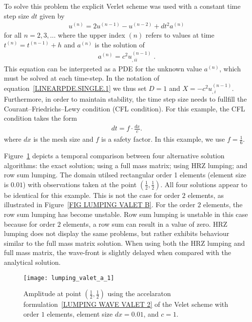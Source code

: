 To solve this problem the explicit Verlet scheme was used 
with a constant time step size $dt$ given by 
\begin{eqnarray} \label{LUMPING WAVE VALET}
u^{(n)}=2u^{(n-1)}-u^{(n-2)} + dt^2 a^{(n)}
\end{eqnarray}
for all $n=2,3,\ldots$ where the upper index ${(n)}$ refers to values at 
time $t^{(n)}=t^{(n-1)}+h$ and $a^{(n)}$ is the solution of 
\begin{eqnarray} \label{LUMPING WAVE VALET 2} 
a^{(n)}=c^2 u^{(n-1)}_{,ii} \; .
\end{eqnarray}
This equation can be interpreted as a PDE for the unknown value $a^{(n)}$,
which must be solved at each time-step. 
In the notation of equation~\ref{LINEARPDE.SINGLE.1} we thus set $D=1$ and 
$X=-c^2 u^{(n-1)}_{,i}$. Furthermore, in order to maintain stability, 
the time step size needs to fullfill the Courant–Friedrichs–Lewy condition 
(CFL condition).
For this example, the CFL condition takes the form 
\begin{eqnarray} \label{LUMPING WAVE CFL} 
dt = f \cdot \frac{dx}{c} .
\end{eqnarray}
where $dx$ is the mesh size and $f$ is a safety factor. In this example, 
we use $f=\frac{1}{6}$.

Figure~\ref{FIG LUMPING VALET A} depicts a temporal comparison between four 
alternative solution algorithms: the exact solution; using a full mass matrix;
using HRZ lumping; and row sum lumping. The domain utilsed rectangular order 1 
elements (element size is $0.01$) with observations taken at the point 
$(\frac{1}{2},\frac{1}{2})$. 
All four solutions appear to be identical for this example. This is not the case
for order $2$ elements, as illustrated in Figure~\ref{FIG LUMPING VALET B}.
For the order $2$ elements, the row sum lumping has become unstable. Row sum
lumping is unstable in this case because for order $2$ elements, a row sum can 
result in a value of zero. HRZ lumping does not display the same problems, but 
rather exhibits behaviour similar to the full mass matrix solution. When using
both the HRZ lumping and full mass matrix, the wave-front is slightly delayed 
when compared with the analytical solution.

\begin{figure}[ht]
\centerline{\texttt{[image: lumping\_valet\_a\_1]}}
\caption{Amplitude at point $(\frac{1}{2},\frac{1}{2})$ using the accelaraton formulation~\ref{LUMPING WAVE VALET 2} of the 
Velet scheme with order $1$ elements, element size $dx=0.01$, and $c=1$.}
\label{FIG LUMPING VALET A}
\end{figure}

